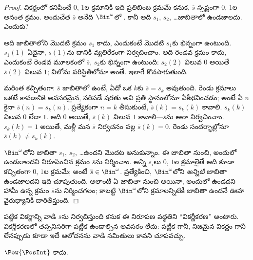 \documentclass[../../../include/open-logic-section]{subfiles}
\begin{document}
\begin{proof}
వికర్ణంలో కనిపించే $0$, $1$ల క్రమానికి ఇది ప్రతిబింబ క్రమమే కనుక,
$\overline{s}$ స్పష్టంగా $0$, $1$ల అనంత క్రమం. అందుచేత
$\overline{s}$ అనేది $\Bin^\omega$లో . కానీ అది
$s_1$, $s_2$, \dots జాబితాలో ఉండజాలదు. ఎందుకు?

అది జాబితాలోని మొదటి క్రమం $s_1$ కాదు, ఎందుకంటే మొదటి
 $s_1$కు భిన్నంగా ఉంటుంది. $s_1(1)$ ఏదైనా,
$\overline{s}(1)$ను దానికి వ్యతిరేకంగా నిర్వచించాం. అది రెండవ క్రమం
కాదు, ఎందుకంటే రెండవ మూలకంలో $\overline{s}$, $s_2$కు భిన్నంగా
ఉంటుంది: $s_2(2)$ విలువ $0$ అయితే $\overline{s}(2)$ విలువ $1$;
విలోమ పరిస్థితిలోనూ అంతే. ఇలాగే కొనసాగుతుంది.

మరింత కచ్చితంగా: $\overline{s}$ జాబితాలో ఉంటే, ఏదో ఒక $k$కు
$\overline{s} = s_{k}$ అవుతుంది. రెండు క్రమాలు ఒకటే కావడానికి అవసరమైన,
సరిపడే షరతు అవి ప్రతి స్థానంలోనూ ఏకీభవించడం; అంటే ఏ $n$కైనా $\overline{s}(n) = s_{k}(n)$.
ప్రత్యేకంగా $n = k$ తీసుకుంటే, $\overline{s}(k) = s_{k}(k)$ కావాలి.
$s_k(k)$ విలువ $0$ లేదా $1$. అది $0$ అయితే, $\overline{s}(k)$ విలువ
$1$ కావాలి---$\overline{s}$ను అలా నిర్వచించాం. $s_k(k) = 1$ అయితే, మళ్లీ
మన $\overline{s}$ నిర్వచనం వల్ల $\overline{s}(k) = 0$.
రెండు సందర్భాల్లోనూ
$\overline{s}(k) \neq s_{k}(k)$.

$\Bin^\omega$లోని  జాబితా $s_1$, $s_2$, \dots ఉందని
మొదట అనుకున్నాం. ఈ జాబితా నుంచి, అందులో ఉండజాలదని నిరూపించిన క్రమం
$\overline{s}$ను నిర్మించాం. అన్ని $s_i$లు $0$, $1$ల క్రమాలైతే అది
కూడా కచ్చితంగా $0$, $1$ల క్రమమే; అంటే $\overline{s} \in \Bin^\omega$.
ప్రత్యేకించి, $\Bin^\omega$లోని  \emph{అన్నిటి} జాబితా
ఉండజాలదని ఇది చూపుతుంది. అలాంటి ఏ జాబితా నుంచి అయినా, అందులో ఉండదని
హామీ ఉన్న క్రమం $\overline{s}$ను నిర్మించగలం; కాబట్టి
$\Bin^\omega$లోని క్రమాలన్నిటికీ జాబితా ఉందనే ఊహ వైరుధ్యానికి దారితీస్తుంది.
\end{proof}

\begin{explain}
పట్టిక వికర్ణాన్ని వాడి $\overline{s}$ను నిర్వచిస్తుంది కనుక ఈ నిరూపణ
పద్ధతిని ``వికర్ణీకరణ'' అంటారు. వికర్ణీకరణలో తప్పనిసరిగా పట్టిక ఉండాల్సిన
అవసరం లేదు: పట్టిక గానీ, నిజమైన వికర్ణం గానీ లేనప్పుడు కూడా ఇదే
ఆలోచనను వాడి సమితులు  కావని చూపవచ్చు.
\end{explain}

\begin{thm}
$\Pow{\PosInt}$  కాదు.
\end{thm}
\end{document}
